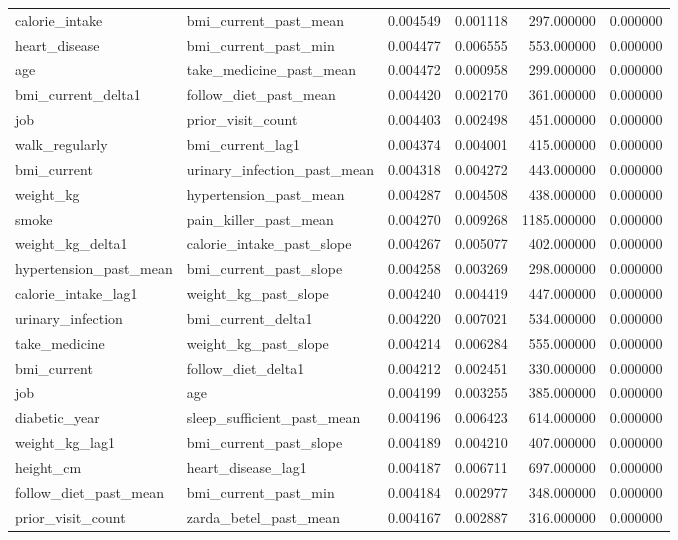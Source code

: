 \begin{longtable}{llrrrr}
calorie\_intake & bmi\_current\_past\_mean & 0.004549 & 0.001118 & 297.000000 & 0.000000 \\
heart\_disease & bmi\_current\_past\_min & 0.004477 & 0.006555 & 553.000000 & 0.000000 \\
age & take\_medicine\_past\_mean & 0.004472 & 0.000958 & 299.000000 & 0.000000 \\
bmi\_current\_delta1 & follow\_diet\_past\_mean & 0.004420 & 0.002170 & 361.000000 & 0.000000 \\
job & prior\_visit\_count & 0.004403 & 0.002498 & 451.000000 & 0.000000 \\
walk\_regularly & bmi\_current\_lag1 & 0.004374 & 0.004001 & 415.000000 & 0.000000 \\
bmi\_current & urinary\_infection\_past\_mean & 0.004318 & 0.004272 & 443.000000 & 0.000000 \\
weight\_kg & hypertension\_past\_mean & 0.004287 & 0.004508 & 438.000000 & 0.000000 \\
smoke & pain\_killer\_past\_mean & 0.004270 & 0.009268 & 1185.000000 & 0.000000 \\
weight\_kg\_delta1 & calorie\_intake\_past\_slope & 0.004267 & 0.005077 & 402.000000 & 0.000000 \\
hypertension\_past\_mean & bmi\_current\_past\_slope & 0.004258 & 0.003269 & 298.000000 & 0.000000 \\
calorie\_intake\_lag1 & weight\_kg\_past\_slope & 0.004240 & 0.004419 & 447.000000 & 0.000000 \\
urinary\_infection & bmi\_current\_delta1 & 0.004220 & 0.007021 & 534.000000 & 0.000000 \\
take\_medicine & weight\_kg\_past\_slope & 0.004214 & 0.006284 & 555.000000 & 0.000000 \\
bmi\_current & follow\_diet\_delta1 & 0.004212 & 0.002451 & 330.000000 & 0.000000 \\
job & age & 0.004199 & 0.003255 & 385.000000 & 0.000000 \\
diabetic\_year & sleep\_sufficient\_past\_mean & 0.004196 & 0.006423 & 614.000000 & 0.000000 \\
weight\_kg\_lag1 & bmi\_current\_past\_slope & 0.004189 & 0.004210 & 407.000000 & 0.000000 \\
height\_cm & heart\_disease\_lag1 & 0.004187 & 0.006711 & 697.000000 & 0.000000 \\
follow\_diet\_past\_mean & bmi\_current\_past\_min & 0.004184 & 0.002977 & 348.000000 & 0.000000 \\
prior\_visit\_count & zarda\_betel\_past\_mean & 0.004167 & 0.002887 & 316.000000 & 0.000000 \\

\end{longtable}
